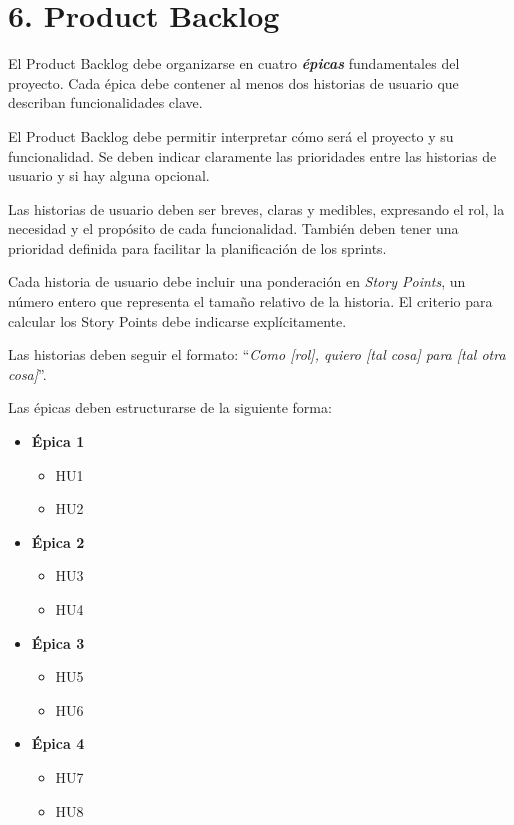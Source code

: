 \documentclass[
11pt, %
]{charter}
\begin{document}
\section{6. Product Backlog}
\label{sec:backlog}

El Product Backlog debe organizarse en cuatro \textbf{\textit{\'{e}picas}} fundamentales del proyecto. Cada \'{e}pica debe contener al menos dos historias de usuario que describan funcionalidades clave.

El Product Backlog debe permitir interpretar cómo será el proyecto y su funcionalidad. Se deben indicar claramente las prioridades entre las historias de usuario y si hay alguna opcional.

Las historias de usuario deben ser breves, claras y medibles, expresando el rol, la necesidad y el propósito de cada funcionalidad. También deben tener una prioridad definida para facilitar la planificación de los sprints.

Cada historia de usuario debe incluir una ponderación en \textit{Story Points}, un número entero que representa el tama\~no relativo de la historia. El criterio para calcular los Story Points debe indicarse explícitamente.

Las historias deben seguir el formato: ``\textit{Como [rol], quiero [tal cosa] para [tal otra cosa]}''.

Las \'{e}picas deben estructurarse de la siguiente forma:

\begin{itemize}
  \item \textbf{\'{E}pica 1}
    \begin{itemize}
      \item HU1
      \item HU2
    \end{itemize}
  \item \textbf{\'{E}pica 2}
    \begin{itemize}
      \item HU3
      \item HU4
    \end{itemize}
  \item \textbf{\'{E}pica 3}
    \begin{itemize}
      \item HU5
      \item HU6
    \end{itemize}
  \item \textbf{\'{E}pica 4}
    \begin{itemize}
      \item HU7
      \item HU8
    \end{itemize}
\end{itemize}
\end{document}

